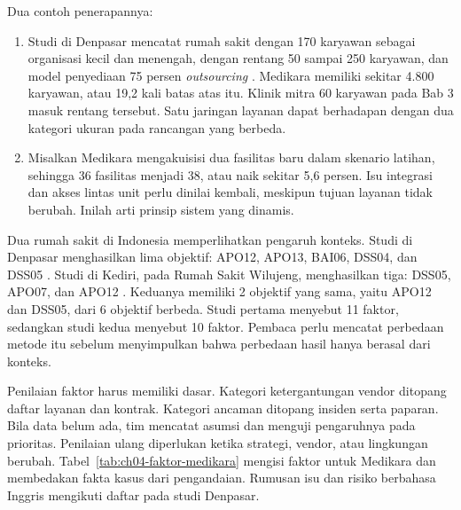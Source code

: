 Dua contoh penerapannya:
\begin{enumerate}
  \item Studi di Denpasar mencatat rumah sakit dengan 170 karyawan sebagai organisasi kecil dan menengah,
  dengan rentang 50 sampai 250 karyawan, dan model penyediaan 75 persen \textit{outsourcing}
  \cite{c04-denpasar}. Medikara memiliki sekitar 4.800 karyawan, atau 19,2 kali batas atas itu. Klinik mitra
  60 karyawan pada Bab 3 masuk rentang tersebut. Satu jaringan layanan dapat berhadapan dengan dua kategori
  ukuran pada rancangan yang berbeda.
  \item Misalkan Medikara mengakuisisi dua fasilitas baru dalam skenario latihan, sehingga 36 fasilitas menjadi
  38, atau naik sekitar 5,6 persen. Isu integrasi dan akses lintas unit perlu dinilai kembali, meskipun tujuan
  layanan tidak berubah. Inilah arti prinsip sistem yang dinamis.
\end{enumerate}

Dua rumah sakit di Indonesia memperlihatkan pengaruh konteks. Studi di Denpasar menghasilkan lima objektif:
APO12, APO13, BAI06, DSS04, dan DSS05 \cite{c04-denpasar}. Studi di Kediri, pada Rumah Sakit Wilujeng,
menghasilkan tiga: DSS05, APO07, dan APO12 \cite{c04-wilujeng}. Keduanya memiliki 2 objektif yang sama, yaitu
APO12 dan DSS05, dari 6 objektif berbeda. Studi pertama menyebut 11 faktor, sedangkan studi kedua menyebut 10
faktor. Pembaca perlu mencatat perbedaan metode itu sebelum menyimpulkan bahwa perbedaan hasil hanya berasal
dari konteks.

Penilaian faktor harus memiliki dasar. Kategori ketergantungan vendor ditopang daftar layanan dan kontrak.
Kategori ancaman ditopang insiden serta paparan. Bila data belum ada, tim mencatat asumsi dan menguji
pengaruhnya pada prioritas. Penilaian ulang diperlukan ketika strategi, vendor, atau lingkungan berubah.
Tabel~\ref{tab:ch04-faktor-medikara} mengisi faktor untuk Medikara dan membedakan fakta kasus dari
pengandaian. Rumusan isu dan risiko berbahasa Inggris mengikuti daftar pada studi Denpasar.


